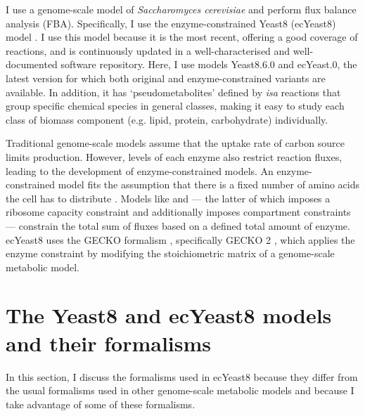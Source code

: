 I use a genome-scale model of \textit{Saccharomyces cerevisiae} and perform flux balance analysis (FBA).
Specifically, I use the enzyme-constrained Yeast8 (ecYeast8) model \parencite{luConsensusCerevisiaeMetabolic2019}.
I use this model because it is the most recent, offering a good coverage of reactions, and is continuously updated in a well-characterised and well-documented software repository.
Here, I use models Yeast8.6.0 and ec\-Yeast.0, the latest version for which both original and enzyme-constrained variants are available.
In addition, it has `pseudometabolites' defined by \textit{isa} reactions \parencite{heavnerYeastExpandedReconstruction2012} that group specific chemical species in general classes, making it easy to study each class of biomass component (e.g. lipid, protein, carbohydrate) individually.

Traditional genome-scale models assume that the uptake rate of carbon source limits production.
However, levels of each enzyme also restrict reaction fluxes, leading to the development of enzyme-constrained models.
An enzyme-constrained model fits the assumption that there is a fixed number of amino acids the cell has to distribute \parencite{weisseMechanisticLinksCellular2015}.
Models like \textcite{sanchezImprovingPhenotypePredictions2017} and \textcite{elsemmanWholecellModelingYeast2022} --- the latter of which imposes a ribosome capacity constraint and additionally imposes compartment constraints --- constrain the total sum of fluxes based on a defined total amount of enzyme.
ecYeast8 uses the GECKO formalism \parencite{sanchezImprovingPhenotypePredictions2017}, specifically GECKO 2 \parencite{domenzainReconstructionCatalogueGenomescale2022}, which applies the enzyme constraint by modifying the stoichiometric matrix of a genome-scale metabolic model.

\section{The Yeast8 and ecYeast8 models and their formalisms}
\label{sec:model-yeast8}

In this section, I discuss the formalisms used in ecYeast8 because they differ from the usual formalisms used in other genome-scale metabolic models and because I take advantage of some of these formalisms.

